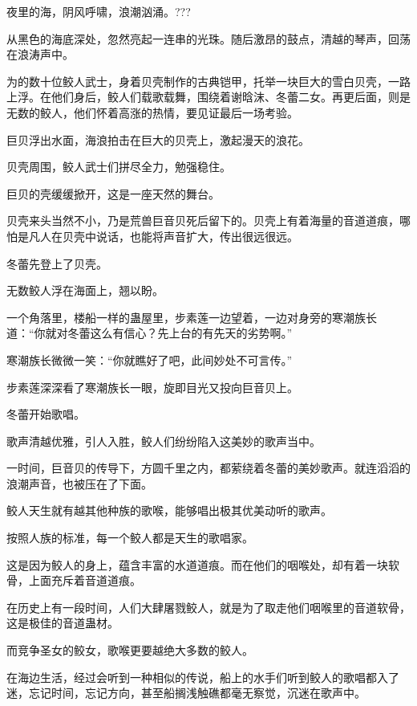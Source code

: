 
\begin{this_body}



夜里的海，阴风呼啸，浪潮汹涌。???

从黑色的海底深处，忽然亮起一连串的光珠。随后激昂的鼓点，清越的琴声，回荡在浪涛声中。

为的数十位鲛人武士，身着贝壳制作的古典铠甲，托举一块巨大的雪白贝壳，一路上浮。在他们身后，鲛人们载歌载舞，围绕着谢晗沫、冬蕾二女。再更后面，则是无数的鲛人，他们怀着高涨的热情，要见证最后一场考验。

巨贝浮出水面，海浪拍击在巨大的贝壳上，激起漫天的浪花。

贝壳周围，鲛人武士们拼尽全力，勉强稳住。

巨贝的壳缓缓掀开，这是一座天然的舞台。

贝壳来头当然不小，乃是荒兽巨音贝死后留下的。贝壳上有着海量的音道道痕，哪怕是凡人在贝壳中说话，也能将声音扩大，传出很远很远。

冬蕾先登上了贝壳。

无数鲛人浮在海面上，翘以盼。

一个角落里，楼船一样的蛊屋里，步素莲一边望着，一边对身旁的寒潮族长道：“你就对冬蕾这么有信心？先上台的有先天的劣势啊。”

寒潮族长微微一笑：“你就瞧好了吧，此间妙处不可言传。”

步素莲深深看了寒潮族长一眼，旋即目光又投向巨音贝上。

冬蕾开始歌唱。

歌声清越优雅，引人入胜，鲛人们纷纷陷入这美妙的歌声当中。

一时间，巨音贝的传导下，方圆千里之内，都萦绕着冬蕾的美妙歌声。就连滔滔的浪潮声音，也被压在了下面。

鲛人天生就有越其他种族的歌喉，能够唱出极其优美动听的歌声。

按照人族的标准，每一个鲛人都是天生的歌唱家。

这是因为鲛人的身上，蕴含丰富的水道道痕。而在他们的咽喉处，却有着一块软骨，上面充斥着音道道痕。

在历史上有一段时间，人们大肆屠戮鲛人，就是为了取走他们咽喉里的音道软骨，这是极佳的音道蛊材。

而竞争圣女的鲛女，歌喉更要越绝大多数的鲛人。

在海边生活，经过会听到一种相似的传说，船上的水手们听到鲛人的歌唱都入了迷，忘记时间，忘记方向，甚至船搁浅触礁都毫无察觉，沉迷在歌声中。


\end{this_body}
